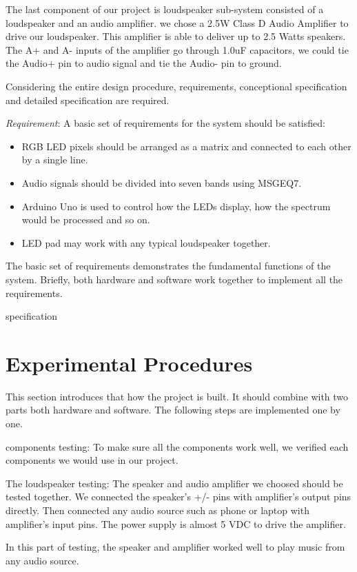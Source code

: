 \documentclass[12pt,a4paper,journal]{IEEEtran}
\begin{document}
The last component of our project is loudspeaker sub-system consisted of a loudspeaker and an audio amplifier. we chose a 2.5W Class D Audio Amplifier to drive our loudspeaker. This amplifier is able to deliver up to 2.5 Watts speakers. The A+ and A- inputs of the amplifier go through 1.0uF capacitors, we could tie the Audio+ pin to audio signal and tie the Audio- pin to ground.

Considering the entire design procedure, requirements, conceptional specification and detailed specification are required.

\emph{Requirement}: A basic set of requirements for the system should be satisfied: 
\begin{itemize}
\item RGB LED pixels should be arranged as a matrix and connected to each other by a single line.
\item Audio signals should be divided into seven bands using MSGEQ7.
\item Arduino Uno is used to control how the LEDs display, how the spectrum would be processed and so on.
\item LED pad may work with any typical loudspeaker together.
\end{itemize}

The basic set of requirements demonstrates the fundamental functions of the system. Briefly, both hardware and software work together to implement all the requirements.

specification

\section{Experimental Procedures}

This section introduces that how the project is built. It should combine with two parts both hardware and software. The following steps are implemented one by one.

components testing: To make sure all the components work well, we  verified each components we would use in our project.

The loudspeaker testing: The speaker and audio amplifier we choosed should be tested together. We connected the speaker's +/- pins with amplifier's output pins directly. Then connected any audio source such as phone or laptop with amplifier's input pins. The power supply is almost 5 VDC to drive the amplifier.

In this part of testing, the speaker and amplifier worked well to play music from any audio source.
\end{document}
